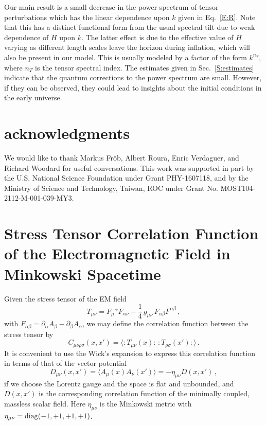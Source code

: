 \documentclass[preprint,prd,showpacs,superscriptaddress]{revtex4}
\begin{document}
Our main result is a small decrease in the power spectrum of tensor perturbations which has the linear dependence upon
$k$ given in Eq.~\eqref{E:R}. Note that this has a distinct functional form from the usual spectral tilt due to weak dependence
of $H$ upon $k$. The latter effect is due to the effective value of $H$ varying as different length scales leave the horizon
during inflation, which will also be present in our model. This is usually modeled by a factor of the form $k^{n_T}$, where
$n_T$ is the tensor spectral index. The estimates given in Sec.~\ref{S:estimates} indicate that the quantum corrections to 
the power spectrum are small. However, if they can be observed, they could lead to insights about the initial conditions in
the early universe. 

   
 
\section{acknowledgments}
We would like to thank Markus Fr{\"o}b, Albert Roura, Enric Verdaguer, and Richard Woodard for useful conversations.
This work was supported in part  by the U.S. National Science Foundation under Grant PHY-1607118, and by the 
Ministry of Science and Technology, Taiwan, ROC under Grant No. MOST104-2112-M-001-039-MY3.


\appendix
\section{Stress Tensor Correlation Function of the Electromagnetic Field in Minkowski Spacetime}
Given the stress tensor of the EM field
\begin{equation}\label{E:fnewr}
	T_{\mu\nu}=F_{\mu}{}^{\alpha}F_{\alpha\nu}-\frac{1}{4}\,g_{\mu\nu}\,F_{\alpha\beta}F^{\alpha\beta}\,,
\end{equation}
with $F_{\alpha\beta}=\partial_{\alpha}A_{\beta}-\partial_{\beta}A_{\alpha}$, we may define the correlation function between the stress tensor by 
\begin{equation}
	C_{\mu\nu\rho\sigma}(x,x')=\langle:T_{\mu\nu}(x):\,:T_{\rho\sigma}(x'):\rangle\,.
\end{equation}
It is convenient to use the Wick's expansion to express this correlation function in terms of that of the vector potential
\begin{equation}
	D_{\mu\nu}(x,x')=\langle A_{\mu}(x)A_{\nu}(x')\rangle=-\eta_{\mu\nu}D(x,x')\,,
\end{equation} 
if we choose the Lorentz gauge and the space is flat and unbounded, and $D(x,x')$ is the corresponding correlation function of the minimally 
coupled, massless scalar field. Here $\eta_{\mu\nu}$ is the Minkowski metric with $\eta_{\mu\nu}={\rm diag}(-1,+1,+1,+1)$.
\end{document}

